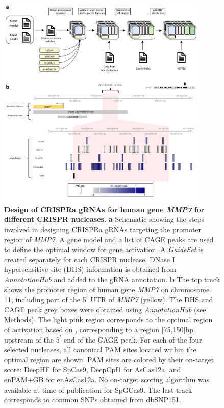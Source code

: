 \documentclass[pdftex,english,10pt]{article}
\begin{document}
{%
\begin{figure}
\centering
\includegraphics[width=0.9\textwidth]{Figure6.pdf}
  \caption{\textbf{Design of CRISPRa gRNAs for human gene \textit{MMP7} for different CRISPR nucleases.} 
  \textbf{a} Schematic showing the steps involved in designing CRISPRa gRNAs targeting the promoter region of \textit{MMP7}.
A gene model and a list of CAGE peaks are used to define the optimal window for gene activation. 
A \textit{GuideSet} is created separately for each CRISPR nuclease.
DNase I hypersensitive site (DHS) information is obtained from \textit{AnnotationHub} and added to the gRNA annotation.
\textbf{b} The top track shows the promoter region of human gene \textit{MMP7} on chromosome 11, including part of the 5$^\prime$ UTR of \textit{MMP7} (yellow). 
The DHS and CAGE peak grey boxes were obtained using \textit{AnnotationHub} (see Methods). 
The light pink region corresponds to the optimal region of activation based on \citet{sanson2018optimized}, corresponding to a region [75,150]bp upstream of the  $5^\prime$ end of the CAGE peak. For each of the four selected nucleases, all canonical PAM sites located within the optimal region are shown. PAM sites are colored by their on-target score: DeepHF for SpCas9, DeepCpf1 for AsCas12a, and enPAM+GB for enAsCas12a. No on-target scoring algorithm was available at time of publication for SpGCas9. The last track corresponds to common SNPs obtained from dbSNP151. 
  }
  \label{fig:crispra}
\end{figure}


}
\end{document}
